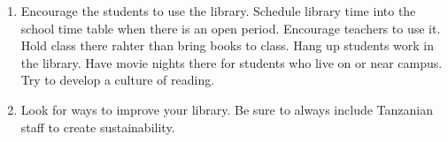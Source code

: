 \begin{enumerate}
\item Encourage the students to use the library.  Schedule library time into the school time table when there is an open period.  Encourage teachers to use it.  Hold class there rahter than bring books to class. Hang up students work in the library. Have movie nights there for students who live on or near campus. Try to develop a culture of reading.

\item Look for ways to improve your library.  Be sure to always include Tanzanian staff to create sustainability. 

\end{enumerate}